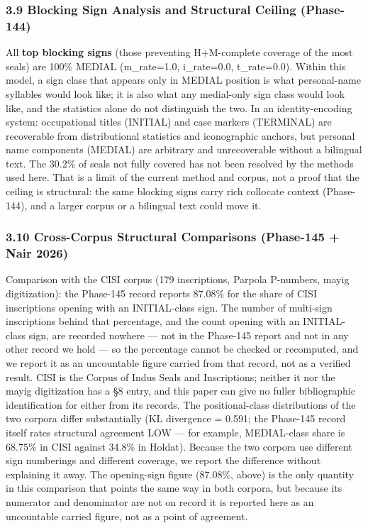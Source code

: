 \documentclass[
]{article}
\begin{document}
\subsubsection{3.9 Blocking Sign Analysis and Structural Ceiling
(Phase-144)}\label{blocking-sign-analysis-and-structural-ceiling-phase-144}

All \textbf{top blocking signs} (those preventing H+M-complete coverage of the most seals) are 100\% MEDIAL (m\_rate=1.0, i\_rate=0.0,
t\_rate=0.0). Within this model, a sign class that appears only in MEDIAL position is what personal-name syllables would look like; it is also what any medial-only sign class would look like, and the statistics alone do not distinguish the two. In an identity-encoding system: occupational titles (INITIAL) and case
markers (TERMINAL) are recoverable from distributional statistics and
iconographic anchors, but personal name components (MEDIAL) are
arbitrary and unrecoverable without a bilingual text. The 30.2\% of seals not fully covered has not been resolved by the methods used here. That is a limit of the current method and corpus, not a proof that the ceiling is structural: the same blocking signs carry rich collocate context (Phase-144), and a larger corpus or a bilingual text could move it.

\subsubsection{3.10 Cross-Corpus Structural Comparisons (Phase-145 + Nair
2026)}\label{cross-corpus-structural-validation-phase-145-nair-2026}

Comparison with the CISI corpus (179 inscriptions, Parpola P-numbers, mayig digitization): the Phase-145 record reports 87.08\% for the share of CISI inscriptions opening with an INITIAL-class sign. The number of multi-sign inscriptions behind that percentage, and the count opening with an INITIAL-class sign, are recorded nowhere --- not in the Phase-145 report and not in any other record we hold --- so the percentage cannot be checked or recomputed, and we report it as an uncountable figure carried from that record, not as a verified result. CISI is the Corpus of Indus Seals and Inscriptions; neither it nor the mayig digitization has a §8 entry, and this paper can give no fuller bibliographic identification for either from its records. The positional-class distributions of the two corpora differ substantially (KL divergence = 0.591; the Phase-145 record itself rates structural agreement LOW --- for example, MEDIAL-class share is 68.75\% in CISI against 34.8\% in Holdat). Because the two corpora use different sign numberings and different coverage, we report the difference without explaining it away. The opening-sign figure (87.08\%, above) is the only quantity in this comparison that points the same way in both corpora, but because its numerator and denominator are not on record it is reported here as an uncountable carried figure, not as a point of agreement.
\end{document}
